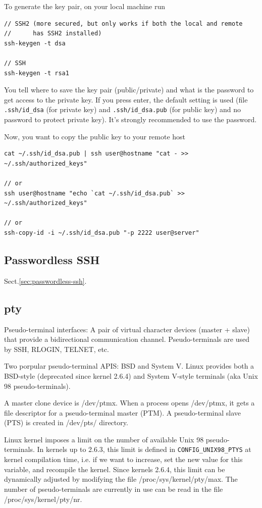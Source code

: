 To generate the key pair, on your local machine run
\begin{verbatim}
// SSH2 (more secured, but only works if both the local and remote
//      has SSH2 installed)
ssh-keygen -t dsa

// SSH
ssh-keygen -t rsa1
\end{verbatim}
You tell where to save the key pair (public/private) and what is the password to
get access to the private key. If you press enter, the default setting is used
(file \verb!.ssh/id_dsa! (for private key) and \verb!.ssh/id_dsa.pub! (for
public key) and no password to protect private key). It's strongly recommended
to use the password.

Now, you want to copy the public key to your remote host
\begin{verbatim}
cat ~/.ssh/id_dsa.pub | ssh user@hostname "cat - >> ~/.ssh/authorized_keys"

// or
ssh user@hostname "echo `cat ~/.ssh/id_dsa.pub` >> ~/.ssh/authorized_keys"

// or
ssh-copy-id -i ~/.ssh/id_dsa.pub "-p 2222 user@server"
\end{verbatim}


\subsection{Passwordless SSH}

Sect.\ref{sec:passwordless-ssh}.

\subsection{pty}
\label{sec:pty}

Pseudo-terminal interfaces: A pair of virtual character devices (master + slave)
that provide a bidirectional communication channel. Pseudo-terminals are used by
SSH, RLOGIN, TELNET, etc. 

Two porpular pseudo-terminal APIS: BSD and System V. Linux provides both a
BSD-style (deprecated since kernel 2.6.4) and System V-style terminals (aka Unix
98 pseudo-terminals).

A master clone device is /dev/ptmx. When a process opens /dev/ptmx, it gets a
file descriptor for a pseudo-terminal master (PTM). A pseudo-terminal slave
(PTS) is created in /dev/pts/ directory. 

Linux kernel imposes a limit on the number of available Unix 98
pseudo-terminals. In kernels up to 2.6.3, this limit is defined in
\verb!CONFIG_UNIX98_PTYS! at kernel compilation time, i.e. if we want to
increase, set the new value for this variable, and recompile the kernel. Since
kernels 2.6.4, this limit can be dynamically adjusted by modifying the file
/proc/sys/kernel/pty/max. The number of pseudo-terminals are currently in use
can be read in the file /proc/sys/kernel/pty/nr.


